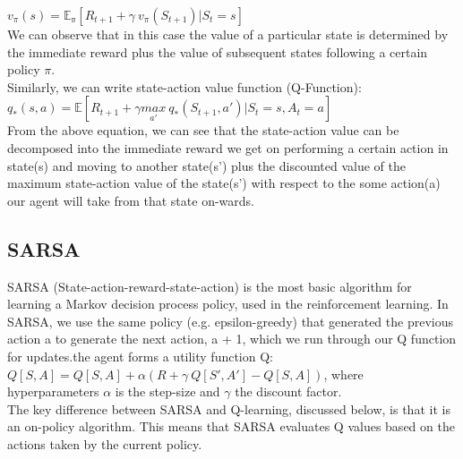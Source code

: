 \documentclass[a4paper, twoside, english]{article}
\begin{document}
 $v_\pi(s) = \mathbb{E_\pi}[R_{t+1}+\gamma \ v_\pi(S_{t+1})|S_t=s]$\\
We can observe that in this case the value of a particular state is determined by the immediate reward plus the value of subsequent states following a certain policy $\pi$. \\ 
Similarly, we can write state-action value function (Q-Function):\\
$q_*(s, a) = \mathbb{E}[R_{t+1}+\gamma\underset{a'}{max} \ q_*(S_{t+1}, a')|S_t=s,A_t=a]$\\
From the above equation, we can see that the state-action value  can be decomposed into the immediate reward we get on performing a certain action in state(s) and moving to another state(s') plus the discounted value of the maximum state-action value of the state(s') with respect to the some action(a) our agent will take from that state on-wards.

\subsection{SARSA}
SARSA (State-action-reward-state-action) is the most basic algorithm for learning a Markov decision process policy, used in the reinforcement learning. In SARSA, we use the same policy (e.g. epsilon-greedy) that generated the previous action a to generate the next action, a + 1, which we run through our Q function for updates.the agent forms a utility function Q:\\
$Q[S,A] = Q[S,A] + \alpha(R+\gamma \ Q[S', A'] - Q[S,A])$, where hyperparameters $\alpha$ is the step-size and $\gamma$ the discount factor.\\

 The key difference between SARSA and Q-learning, discussed below, is that it is an on-policy algorithm. This means that SARSA evaluates Q values based on the actions taken by the current policy. 
\end{document}
